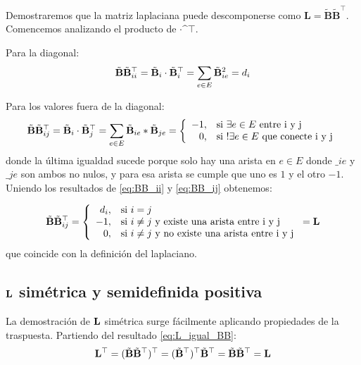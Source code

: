 \documentclass{article}
\begin{document}
Demostraremos que la matriz laplaciana puede descomponerse como $\mathbf{L}=\tilde{\mathbf{B}}\tilde{\mathbf{B}}^\top$. Comencemos analizando el producto de $\bm\cdot\bm^\top$.

Para la diagonal:
\begin{equation}
    \label{eq:BB_ii}
    \tilde{\mathbf{B}}\tilde{\mathbf{B}}^\top_{ii} = \tilde{\mathbf{B}}_i \cdot \tilde{\mathbf{B}}_i^\top = \sum_{e\in E} \tilde{\mathbf{B}}_{ie}^2 = d_i
\end{equation}

Para los valores fuera de la diagonal:
\begin{equation}
    \label{eq:BB_ij}
    \tilde{\mathbf{B}}\tilde{\mathbf{B}}^\top_{ij} = \tilde{\mathbf{B}}_i\cdot\tilde{\mathbf{B}}_j^\top = \sum_{e\in E} \tilde{\mathbf{B}}_{ie} * \tilde{\mathbf{B}}_{je} = \left\lbrace
    \begin{array}{r l}
       -1, & \text{si $\exists e\in E$ entre i y j} \\
       0, & \text{si $!\exists e \in E$ que conecte i y j}
    \end{array}
    \right.
\end{equation}
donde la última igualdad sucede porque solo hay una arista en $e \in E$ donde 
$\bm_{ie}$ y $\bm_{je}$ son ambos no nulos, y para esa arista se cumple que uno es 
$1$ y el otro $-1$. Uniendo los resultados de \eqref{eq:BB_ii} y \eqref{eq:BB_ij} obtenemos:

\begin{equation}
    \label{eq:L_igual_BB}
   \tilde{\mathbf{B}}\tilde{\mathbf{B}}^\top_{ij} = \left\lbrace
   \begin{array}{r l}
        d_i, & \text{si $i=j$} \\
        -1, & \text{si $i\neq j$ y existe una arista entre i y j} \\
        0, & \text{si $i\neq j$ y no existe una arista entre i y j}
   \end{array}
   \right. = \mathbf{L}
\end{equation}
que coincide con la definición del laplaciano.

\subsection{$\mathbf{L}$ simétrica y semidefinida positiva}

La demostración de $\mathbf{L}$ simétrica surge fácilmente aplicando propiedades de la traspuesta. Partiendo del resultado \eqref{eq:L_igual_BB}:
\begin{equation}
    \mathbf{L}^\top = (\tilde{\mathbf{B}}\tilde{\mathbf{B}}^\top)^\top = (\tilde{\mathbf{B}}^\top)^\top \tilde{\mathbf{B}}^\top = \tilde{\mathbf{B}}\tilde{\mathbf{B}}^\top = \mathbf{L}
\end{equation}
\end{document}
